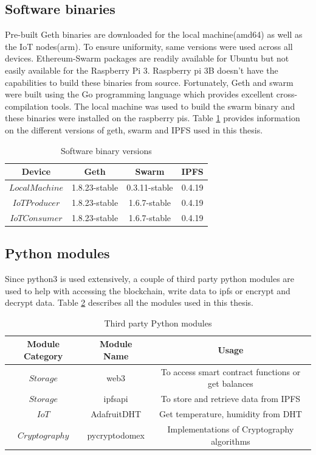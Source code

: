 \documentclass[11pt,openright]{report}
\begin{document}
\subsection{Software binaries}
Pre-built Geth binaries are downloaded for the local machine(amd64) as well as the IoT nodes(arm). To ensure uniformity, same versions were used across all devices. Ethereum-Swarm packages are readily available for Ubuntu but not easily available for the Raspberry Pi 3.
Raspberry pi 3B doesn't have the capabilities to build these binaries from source.
Fortunately, Geth and swarm were built using the Go programming language which provides excellent cross-compilation tools. The local machine was used to build the swarm binary and these binaries were installed on the raspberry pis. Table \ref{software_version} provides information on the different versions of geth, swarm and IPFS used in this thesis.

\begin{table}[!htbp]
	\renewcommand{\arraystretch}{1}
	\caption{Software binary versions}
	\label{software_version}
	\centering
	\begin{tabular}{|c|c|c|c|}
		\hline
		\bfseries Device & \bfseries Geth & \bfseries Swarm  & \bfseries IPFS\\
		\hline\hline
		$Local Machine$ & 1.8.23-stable & 0.3.11-stable & 0.4.19 \\ \hline
		$IoT Producer$ & 1.8.23-stable & 1.6.7-stable & 0.4.19 \\ \hline
		$IoT Consumer$ & 1.8.23-stable & 1.6.7-stable & 0.4.19 \\ \hline
	\end{tabular}
\end{table}

\subsection{Python modules}
Since python3 is used extensively, a couple of third party python modules are used to help with accessing the blockchain, write data to ipfs or encrypt and decrypt data. Table \ref{python_modules} describes all the modules used in this thesis.
\begin{table}[!htbp]
	\renewcommand{\arraystretch}{1.3}
	\caption{Third party Python modules}
	\label{python_modules}
	\centering
	\begin{tabular}{|c|c|c|}
		\hline
		\bfseries Module Category & \bfseries Module Name & \bfseries Usage \\
		\hline\hline
		$Storage$ & web3 & To access smart contract functions or get balances \\ \hline
		$Storage$ & ipfsapi & To store and retrieve data from IPFS \\ \hline
		$IoT$ & AdafruitDHT & Get temperature, humidity from DHT \\ \hline
		$Cryptography$ & pycryptodomex & Implementations of Cryptography algorithms \\ \hline
	\end{tabular}
\end{table}
\end{document}
